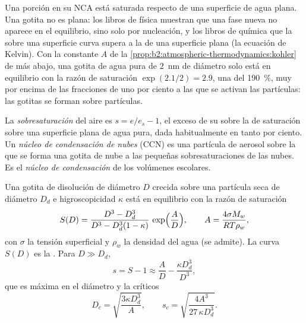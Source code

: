 Una porción en su NCA está saturada respecto de una superficie de agua plana. Una gotita no es plana: los libros
de física muestran que una fase nueva no aparece en el equilibrio, sino solo por nucleación, y los
libros de química que la  sobre una superficie curva supera a la de una superficie plana
(la ecuación de Kelvin). Con la constante $A$ de la \cref{prop:b2:atmospheric-thermodynamics:kohler}
de más abajo, una gotita de agua pura de \qty{2}{nm} de diámetro solo está en equilibrio con la razón de saturación
$\exp(2.1/2) = 2.9$, una  del \qty{190}{\percent}, muy por encima de las fracciones de uno por
ciento a las que se activan las partículas: las gotitas se forman sobre partículas.

\begin{definition}\label{def:b2:atmospheric-thermodynamics:microphysics}
La \emph{sobresaturación} del aire es $s = e/e_s - 1$, el exceso de su
 sobre la  de saturación sobre una superficie plana de agua pura, dada
habitualmente en tanto por ciento. Un \emph{núcleo de condensación de nubes} (CCN)
es una partícula de aerosol sobre la que se forma una gotita de nube a las pequeñas sobresaturaciones de las nubes.
Es el \emph{núcleo de condensación} de los volúmenes escolares.
\end{definition}

\begin{proposition}\label{prop:b2:atmospheric-thermodynamics:kohler}
Una gotita de disolución de diámetro $D$ crecida sobre una partícula seca de diámetro $D_d$ e higroscopicidad
$\kappa$ está en equilibrio con la razón de saturación
\[
  S(D) = \frac{D^3 - D_d^3}{D^3 - D_d^3(1 - \kappa)}\,\exp\Bigl(\frac{A}{D}\Bigr), \qquad
  A = \frac{4\sigma M_w}{R T\rho_w},
\]
con $\sigma$ la tensión superficial y $\rho_w$ la densidad del agua (se admite). La curva $S(D)$
es la \emph{}. Para $D \gg D_d$,
\[
  s = S - 1 \approx \frac{A}{D} - \frac{\kappa D_d^3}{D^3},
\]
que es máxima en el diámetro y la  críticos
\[
  D_c = \sqrt{\frac{3\kappa D_d^3}{A}}, \qquad s_c = \sqrt{\frac{4A^3}{27\,\kappa D_d^3}} .
\]
\end{proposition}

